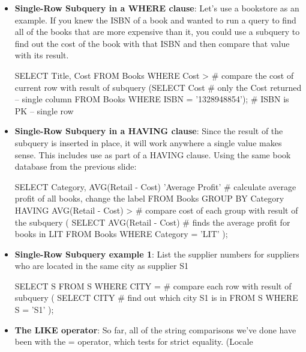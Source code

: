 \documentclass{report}
\begin{document}
\begin{itemize}
        \item \textbf{Single-Row Subquery in a WHERE clause}: Let's use a bookstore as an example. If you knew the ISBN of a book and wanted to run a query to find all of the books that are more expensive than it, you could use a subquery to find out the cost of the book with that ISBN and then compare that value with its result.
            \bigbreak \noindent 
            \begin{sqlcode}
            SELECT Title, Cost
                FROM Books
                WHERE Cost > # compare the cost of current row with result of subquery
                    (SELECT Cost # only the Cost returned -- single column
                    FROM Books
                    WHERE ISBN = '1328948854'); # ISBN is PK -- single row
            \end{sqlcode}
        \item \textbf{Single-Row Subquery in a HAVING clause}: Since the result of the subquery is inserted in place, it will work anywhere a single value makes sense. This includes use as part of a HAVING clause. Using the same book database from the previous slide:
            \bigbreak \noindent 
            \begin{sqlcode}
                SELECT Category,
                    AVG(Retail - Cost) 'Average Profit' # calculate average profit of all books, change the label
                    FROM Books
                    GROUP BY Category
                    HAVING AVG(Retail - Cost) > # compare cost of each group with result of the subquery
                        ( SELECT AVG(Retail - Cost) # finds the average profit for books in LIT
                        FROM Books
                        WHERE Category = 'LIT' );
            \end{sqlcode}
        \item \textbf{Single-Row Subquery example 1}: List the supplier numbers for suppliers who are located in the same city as supplier S1
            \bigbreak \noindent 
            \begin{sqlcode}
                SELECT S
                    FROM S
                    WHERE CITY = # compare each row with result of subquery
                        ( SELECT CITY # find out which city S1 is in
                        FROM S
                        WHERE S = 'S1' );
                    \end{sqlcode}
        \item \textbf{The LIKE operator}: So far, all of the string comparisons we've done have been with the = operator, which tests for strict equality. (Locale

\end{itemize}
\end{document}
